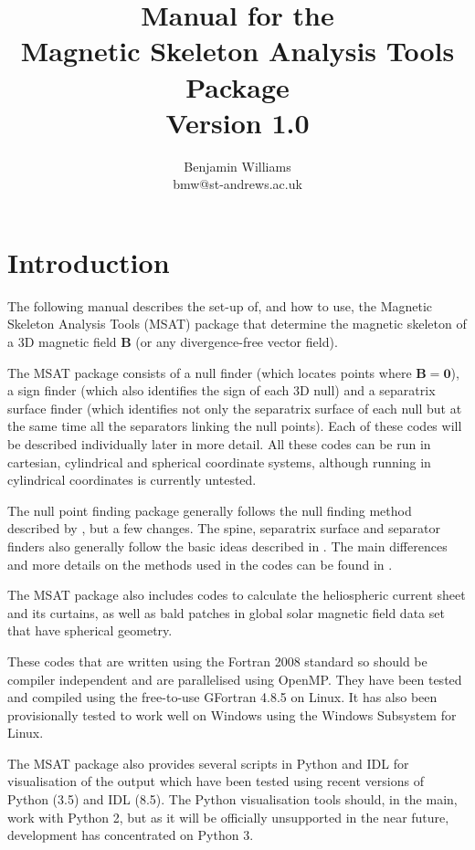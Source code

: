 \documentclass[12pt]{article}
\author{Benjamin Williams \\ bmw@st-andrews.ac.uk}
\title{Manual for the \\ Magnetic Skeleton Analysis Tools Package \\ \( \; \) \\ Version 1.0}
\renewcommand{\vec}[1]{\mathbf{#1}}
\begin{document}
  \maketitle

  \tableofcontents

  \newpage

  \section{Introduction}

    The following manual describes the set-up of, and how to use, the Magnetic Skeleton Analysis Tools (MSAT) package that determine the magnetic skeleton of a 3D magnetic field \( \vec{B} \) (or any divergence-free vector field).

    The MSAT package consists of a null finder (which locates points where \( \vec{B} = \vec{0} \)), a sign finder (which also identifies the sign of each 3D null) and a separatrix surface finder (which identifies not only the separatrix surface of each null but at the same time all the separators linking the null points). Each of these codes will be described individually later in more detail.  All these codes can be run in cartesian, cylindrical and spherical coordinate systems, although running in cylindrical coordinates is currently untested.

    The null point finding package generally follows the null finding method described by \textcite{Haynes2007}, but a few changes. The spine, separatrix surface and separator finders also generally follow the basic ideas described in \textcite{Haynes2007}. The main differences and more details on the methods used in the codes can be found in \textcite{WilliamsPhD2018}.

    The MSAT package also includes codes to calculate the heliospheric current sheet and its curtains, as well as bald patches in global solar magnetic field data set that have spherical geometry.

    These codes that are written using the Fortran 2008 standard so should be compiler independent and are parallelised using OpenMP. They have been tested and compiled using the free-to-use GFortran 4.8.5 on Linux. It has also been provisionally tested to work well on Windows using the Windows Subsystem for Linux.

    The MSAT package also provides several scripts in Python and IDL for visualisation of the output which have been tested using recent versions of Python (3.5) and IDL (8.5). The Python visualisation tools should, in the main, work with Python 2, but as it will be officially unsupported in the near future, development has concentrated on Python 3.
\end{document}

